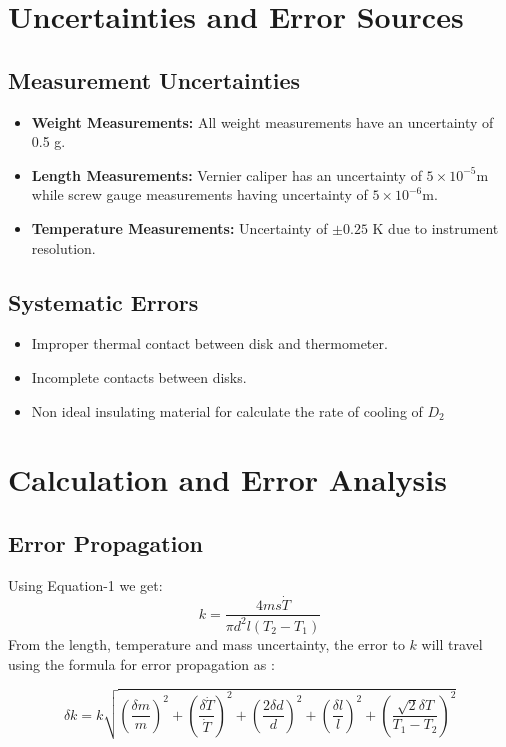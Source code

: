 \documentclass[%
 reprint,
 sor,
 jor,
 amsmath,amssymb,
 aps,
]{revtex4-2}
\begin{document}
\section{Uncertainties and Error Sources}
\subsection{Measurement Uncertainties}
\begin{itemize}
	\item \textbf{Weight Measurements:} All weight measurements have an uncertainty of 0.5 g.
	\item \textbf{Length Measurements:} Vernier caliper has an uncertainty of $5\times 10^{-5}$m while screw gauge measurements having uncertainty of $5\times 10^{-6}$m.
    \item \textbf{Temperature Measurements:} Uncertainty of $\pm 0.25$ \si{\kelvin} due to instrument resolution.
\end{itemize}

\subsection{Systematic Errors}
\begin{itemize}
	\item Improper thermal contact between disk and thermometer. 
	\item Incomplete contacts between disks.
	\item Non ideal insulating material for calculate the rate of cooling of $D_2$
\end{itemize}



\section{Calculation and Error Analysis}
\subsection{Error Propagation}
Using Equation-1 we get:
$$k=\frac{4ms\dot{T}}{\pi d^2 l(T_2-T_1)}$$
From the length, temperature and mass uncertainty, the error to $k$ will travel using the formula for error propagation as \cite{erroranalysis}: 

\begin{widetext}
	\begin{equation}
\delta k = k\sqrt{
	\left( \frac{\delta m}{ m}\right)^2 + 
	\left( \frac{\delta \dot{T}}{ \dot{T}}\right)^2 + 
	\left( \frac{2\delta d}{ d}\right)^2 + 
	\left( \frac{\delta l}{ l}\right)^2 + 
	\left( \frac{\sqrt 2\delta T}{ T_1 - T_2}\right)^2 
}
\end{equation}
\end{widetext}
\end{document}
